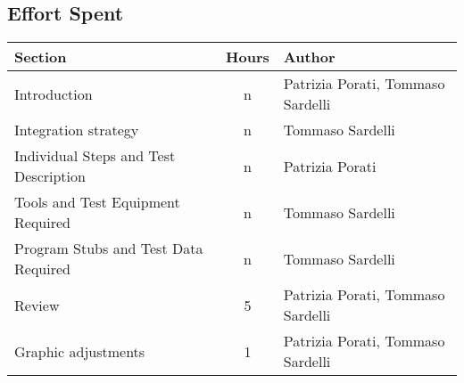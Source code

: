 \subsection{Effort Spent}

\begin{center}
	\vspace{0.2cm}
	\begin{tabular}{ l c l } 
		\hline
		Section 					& Hours & Author \\ 
		\hline
		Introduction								& n 	& Patrizia Porati, Tommaso Sardelli	\\
		Integration strategy						& n 	& Tommaso Sardelli	\\
		Individual Steps and Test Description 		& n 	& Patrizia Porati \\ 
		Tools and Test Equipment Required 			& n	 	& Tommaso Sardelli \\
		Program Stubs and Test Data Required		& n		& Tommaso Sardelli \\
		Review										& 5		& Patrizia Porati, Tommaso Sardelli	\\
		Graphic adjustments     				    & 1		& Patrizia Porati, Tommaso Sardelli	\\
		\hline
	\end{tabular}
\end{center}
